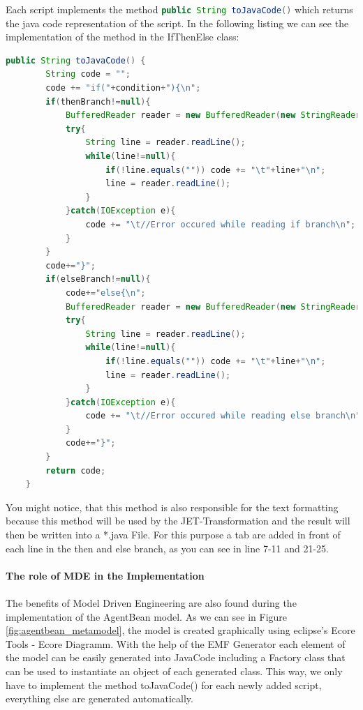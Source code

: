 Each script implements the method \lstinline[language=Java]{public String toJavaCode()} which returns the java code representation of the script.
In the following listing we can see the implementation of the method in the IfThenElse class:
\begin{lstlisting}[language = Java, caption = toJavaCode() implementation in the IfThenElse class]
	public String toJavaCode() {
		String code = "";
		code += "if("+condition+"){\n";
		if(thenBranch!=null){
			BufferedReader reader = new BufferedReader(new StringReader(thenBranch.toJavaCode()));
			try{
				String line = reader.readLine();
				while(line!=null){
					if(!line.equals("")) code += "\t"+line+"\n";
					line = reader.readLine();
				}
			}catch(IOException e){
				code += "\t//Error occured while reading if branch\n";
			}
		}
		code+="}";
		if(elseBranch!=null){
			code+="else{\n";
			BufferedReader reader = new BufferedReader(new StringReader(elseBranch.toJavaCode()));
			try{
				String line = reader.readLine();
				while(line!=null){
					if(!line.equals("")) code += "\t"+line+"\n";
					line = reader.readLine();
				}
			}catch(IOException e){
				code += "\t//Error occured while reading else branch\n";
			}
			code+="}";
		}
		return code;
	}
\end{lstlisting}

You might notice, that this method is also responsible for the text formatting because this method will be used by the JET-Transformation and the result will then be written into a *.java File. For this purpose a tab are added in front of each line in the then and else branch, as you can see in line 7-11 and 21-25.\\\\
\textbf{The role of MDE in the Implementation}\\\\
The benefits of Model Driven Engineering are also found during the implementation of the AgentBean model. As we can see in Figure \ref{fig:agentbean_metamodel}, the model is created graphically using eclipse's Ecore Tools - Ecore Diagramm. With the help of the EMF Generator each element of the model can be easily generated into JavaCode including a Factory class that can be used to instantiate an object of each generated class. This way, we only have to implement the method toJavaCode() for each newly added script, everything else are generated automatically. 


